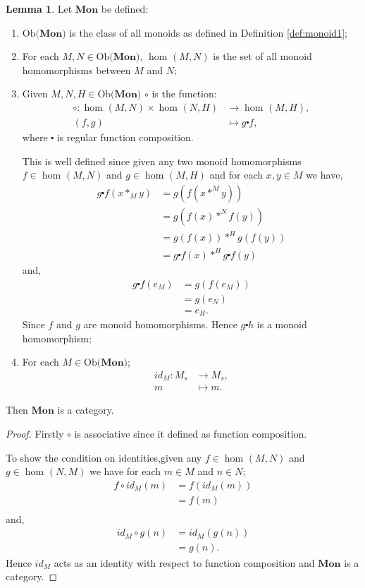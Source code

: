 \documentclass[11pt,a4paper]{article}
\theoremstyle{definition}
\newtheorem{lemma}[thm]{Lemma}
\newcommand\ho[3][]{\hom_{#1}(#2,#3)}
\newcommand\ob[1]{\mathrm{Ob(}#1\mathrm{)}}
\numberwithin{equation}{section}
\begin{document}
\begin{lemma}
\label{lem:catofmon}
Let $\mathbf{Mon}$ be defined:
\begin{enumerate}
    \item $\ob{\mathbf{Mon}}$ is the class of all monoids as defined in Definition \ref{def:monoid1};
    \item For each $M,N\in\ob{\mathbf{Mon}}$, $\ho{M}{N}$ is the set of all monoid homomorphisms between $M$ and $N$;
    \item Given $M,N,H\in\ob{\mathbf{Mon}}$ $\circ$ is the function:
    \begin{align*}
        \circ\colon \ho{M}{N}\times\ho{N}{H}&\rightarrow\ho{M}{H},\\
        (f,g)&\mapsto g \centerdot f,
    \end{align*}
    where $\centerdot$ is regular function composition. 
    
    This is well defined since given any two monoid homomorphisms $f\in\ho{M}{N}$ and $g\in\ho{M}{H}$ and for each $x,y\in M$ we have,
    \begin{align*}
        g\centerdot f(x*_{M}y) &= g(f(x*^{M}y))\\
        &= g(f(x)*^{N}f(y))\\
        &= g(f(x))*^{H}g(f(y))\\
        &= g\centerdot f(x) *^{H} g\centerdot f(y)
    \end{align*}
    and,
    \begin{align*}
        g\centerdot f(e_{M}) &= g(f(e_{M}))\\
        &= g(e_{N})\\
        &= e_{H}.
    \end{align*}
    Since $f$ and $g$ are monoid homomorphisms. Hence $g\centerdot h$ is a monoid homomorphism;
    \item For each $M\in\ob{\mathbf{Mon}}$;
    \begin{align*}
        id_{M}\colon M_{s} &\rightarrow M_{s},\\
        m&\mapsto m.
    \end{align*}
\end{enumerate}
Then $\mathbf{Mon}$ is a category.
\end{lemma}
\begin{proof}
Firstly $\circ$ is associative since it defined as function composition. 

To show the condition on identities,given any $f\in\ho{M}{N}$ and $g\in\ho{N}{M}$ we have for each $m\in M$ and $n\in N$;
\begin{align*}
    f\circ id_{M}(m) &= f(id_{M}(m))\\
    &=f(m)\\
\end{align*}
and,
\begin{align*}
    id_{M} \circ g(n) &= id_{M}(g(n))\\
    &= g(n).
\end{align*}
Hence $id_{M}$ acts as an identity with respect to function composition and $\mathbf{Mon}$ is a category.
\end{proof}
\end{document}
